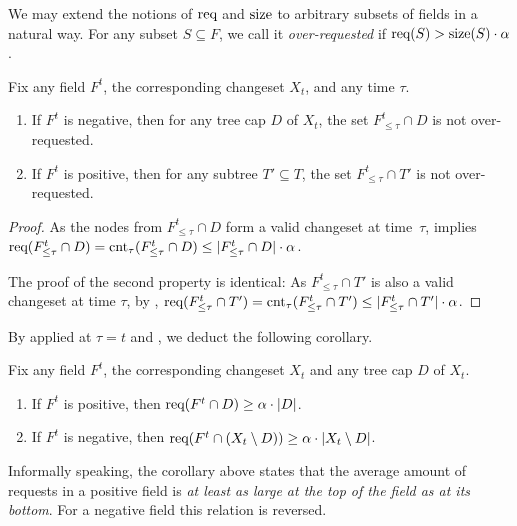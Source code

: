 We may extend the notions of $\textrm{req}$ and $\textrm{size}$ to arbitrary subsets of fields
in a natural way.
For any subset $S \subseteq F$, we call it \emph{over-requested} if
$\textrm{req}(S) > \textrm{size}(S) \cdot \alpha$. 

\begin{lemma}
\label{lem:not_over-requested}
Fix any field $F^t$, the corresponding changeset $X_t$, and any time $\tau$.
\begin{enumerate}
\item If $F^t$ is negative, then for any tree cap $D$ of $X_t$, the set
    $F^t_{\leq \tau} \cap D$ is not over-requested.
\item If $F^t$ is positive, then for any subtree $T' \subseteq T$, the set
    $F^t_{\leq \tau} \cap T'$ is not over-requested.
\end{enumerate}
\end{lemma}

\begin{proof} 
As the nodes from $F^t_{\leq \tau} \cap D$ form a valid changeset at time~$\tau$, 
 implies $\textrm{req}(F^t_{\leq
\tau} \cap D) = \textrm{cnt}_\tau(F^t_{\leq \tau} \cap D) \leq |F^t_{\leq \tau} \cap
D| \cdot \alpha$.

The proof of the second property is identical: As $F^t_{\leq \tau} \cap T'$ is
also a valid changeset at time $\tau$, by
, $\textrm{req}(F^t_{\leq \tau}
\cap T') = \textrm{cnt}_\tau(F^t_{\leq \tau} \cap T')
\leq |F^t_{\leq \tau} \cap T'| \cdot \alpha$. 
\end{proof}

By  applied at $\tau = t$ and
, we deduct the following corollary.

\begin{corollary}
\label{cor:density}
Fix any field $F^t$, the corresponding changeset $X_t$ and any tree
cap $D$ of $X_t$. 
\begin{enumerate}
\item If $F^t$ is positive, then $\textrm{req}(F^t \cap D) \geq \alpha \cdot |D|$.
\item If $F^t$ is negative, then $\textrm{req}(F^t \cap (X_t \setminus D)) \geq 
  \alpha \cdot \text{$|X_t \setminus D|$}$.
\end{enumerate}
\end{corollary} 

Informally speaking, the corollary above states that the average amount of
requests in a positive field is \emph{at least as large at the top of the
field as at its bottom}. For a negative field this relation is reversed.


